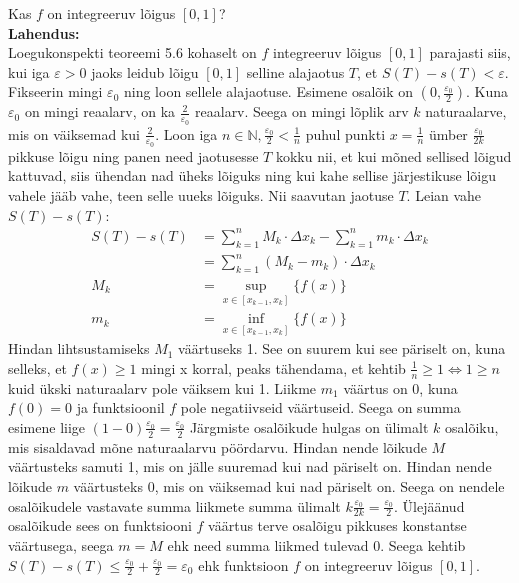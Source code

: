 \documentclass{article}
\begin{document}
Kas $f$ on integreeruv l\~oigus $[0,1]$?\\
\textbf{Lahendus:}\\
Loegukonspekti teoreemi 5.6 kohaselt on $f$ integreeruv l\~oigus $[0,1]$ parajasti siis, kui iga $\varepsilon>0$ jaoks leidub l\~oigu $[0,1]$ selline alajaotus $T$, et $S(T)-s(T)<\varepsilon$. Fikseerin mingi $\varepsilon_0$ ning loon sellele alajaotuse. Esimene osal\~oik on $(0,\frac{\varepsilon_0}{2})$. Kuna $\varepsilon_0$ on mingi reaalarv, on ka $\frac{2}{\varepsilon_0}$ reaalarv. Seega on mingi l\~oplik arv $k$ naturaalarve, mis on v\"aiksemad kui $\frac{2}{\varepsilon_0}$. Loon iga $n\in\mathbb{N}, \frac{\varepsilon_0}{2}<\frac{1}{n}$ puhul punkti $x=\frac{1}{n}$ \"umber $\frac{\varepsilon_0}{2k}$ pikkuse l\~oigu ning panen need jaotusesse $T$ kokku nii, et kui m\~oned sellised l\~oigud kattuvad, siis \"uhendan nad \"uheks l\~oiguks ning kui kahe sellise j\"arjestikuse l\~oigu vahele j\"a\"ab vahe, teen selle uueks l\~oiguks. Nii saavutan jaotuse $T$. Leian vahe $S(T)-s(T)$:
\begin{equation*}
\begin{aligned}
S(T)-s(T)&=\sum_{k=1}^nM_k\cdot \Delta x_k-\sum_{k=1}^nm_k\cdot \Delta x_k\\
&=\sum_{k=1}^n(M_k-m_k)\cdot \Delta x_k\\
M_k&=\sup_{x\in[x_{k-1},x_k]}\{f(x)\}\\
m_k&=\inf_{x\in[x_{k-1},x_k]}\{f(x)\}
\end{aligned}
\end{equation*}
Hindan lihtsustamiseks $M_1$ v\"a\"artuseks 1. See on suurem kui see p\"ariselt on, kuna selleks, et $f(x)\geq1$ mingi x korral, peaks t\"ahendama, et kehtib $\frac{1}{n}\geq1\Leftrightarrow1\geq n$ kuid \"ukski naturaalarv pole v\"aiksem kui 1. Liikme $m_1$ v\"a\"artus on 0, kuna $f(0)=0$ ja funktsioonil $f$ pole negatiivseid v\"a\"artuseid. Seega on summa esimene liige $(1-0)\frac{\varepsilon_0}{2}=\frac{\varepsilon_0}{2}$ J\"argmiste osal\~oikude hulgas on \"ulimalt $k$ osal\~oiku, mis sisaldavad m\~one naturaalarvu p\"o\"ordarvu. Hindan nende l\~oikude $M$ v\"a\"artusteks samuti 1, mis on j\"alle suuremad kui nad p\"ariselt on. Hindan nende l\~oikude $m$ v\"a\"artusteks 0, mis on v\"aiksemad kui nad p\"ariselt on. Seega on nendele osal\~oikudele vastavate summa liikmete summa \"ulimalt $k\frac{\varepsilon_0}{2k}=\frac{\varepsilon_0}{2}$. \"Ulej\"a\"anud osal\~oikude sees on funktsiooni $f$ v\"a\"artus terve osal\~oigu pikkuses konstantse v\"a\"artusega, seega $m=M$ ehk need summa liikmed tulevad 0. Seega kehtib $S(T)-s(T)\leq\frac{\varepsilon_0}{2}+\frac{\varepsilon_0}{2}=\varepsilon_0$ ehk funktsioon $f$ on integreeruv l\~oigus $[0,1]$.\pagebreak\\
\end{document}
